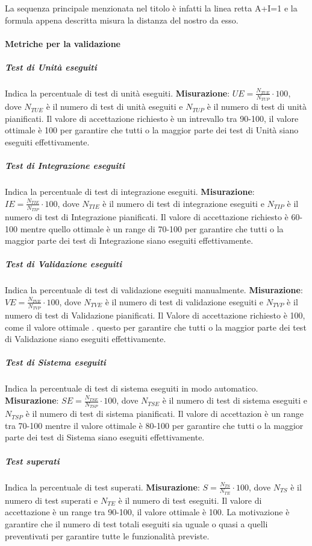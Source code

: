 La sequenza principale menzionata nel titolo è infatti la linea retta A+I=1 e la formula appena descritta misura la distanza del nostro  da esso.

\paragraph{Metriche per la validazione}


\subparagraph{Test di Unità eseguiti}
Indica la percentuale di test di unità eseguiti.
\textbf{Misurazione}: $UE=\frac{N_{TUE}}{N_{TUP}} \cdot 100$, dove $N_{TUE}$ è il numero di test di unità eseguiti e $N_{TUP}$ è il numero di test di unità pianificati.
Il valore di accettazione richiesto è un intrevallo tra 90-100, il valore ottimale è 100 per garantire che tutti o la maggior parte dei test di Unità siano eseguiti effettivamente.

\subparagraph{Test di Integrazione eseguiti}
Indica la percentuale di test di integrazione eseguiti.
\textbf{Misurazione}: $IE=\frac{N_{TIE}}{N_{TIP}} \cdot 100$, dove $N_{TIE}$ è il numero di test di integrazione eseguiti e $N_{TIP}$ è il numero di test di Integrazione pianificati.
Il valore di accettazione richiesto è 60-100 mentre quello ottimale è un range di 70-100 per	garantire che tutti o la maggior parte dei test di Integrazione siano eseguiti effettivamente. 

\subparagraph{Test di Validazione eseguiti}
Indica la percentuale di test di validazione eseguiti manualmente.
\textbf{Misurazione}: $VE=\frac{N_{TVE}}{N_{TVP}} \cdot 100$, dove $N_{TVE}$ è il numero di test di validazione eseguiti e $N_{TVP}$ è il numero di test di Validazione pianificati.
Il Valore di accettazione richiesto è 100, come il valore ottimale . questo per garantire che tutti o la maggior parte dei test di Validazione siano eseguiti effettivamente. 

\subparagraph{Test di Sistema eseguiti}
Indica la percentuale di test di sistema eseguiti in modo automatico.
\textbf{Misurazione}: $SE=\frac{N_{TSE}}{N_{TSP}} \cdot 100$, dove $N_{TSE}$ è il numero di test di sistema eseguiti e $N_{TSP}$ è il numero di test di sistema pianificati.
Il valore di accettazion è un range tra 70-100 mentre il valore ottimale è 80-100 per garantire che tutti o la maggior parte dei test di Sistema siano eseguiti effettivamente.

\subparagraph{Test superati}
Indica la percentuale di test superati.
\textbf{Misurazione}: $S=\frac{N_{TS}}{N_{TE}} \cdot 100$, dove $N_{TS}$ è il numero di test superati e $N_{TE}$ è il numero di test eseguiti.
Il valore di accettazione è un range tra 90-100, il valore ottimale è 100. La motivazione è  garantire che il numero di test totali eseguiti sia uguale o quasi a quelli preventivati per garantire tutte le funzionalità previste. \\

